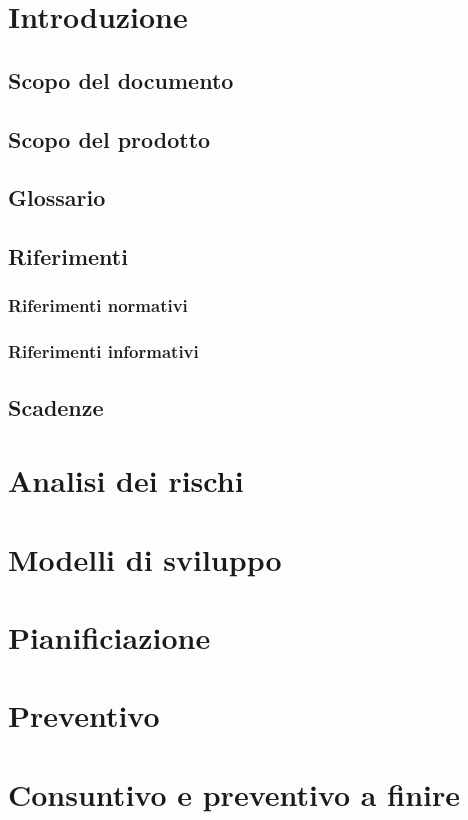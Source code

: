 \documentclass[a4paper, oneside, openany, dvipsnames, table]{article}
\begin{document}
\copertina{}


\newpage
\tableofcontents
\newpage

\section{Introduzione}
	\subsection{Scopo del documento}
		
	\subsection{Scopo del prodotto}
		
	\subsection{Glossario}
		
	\subsection{Riferimenti}
		\subsubsection{Riferimenti normativi}
			
		\subsubsection{Riferimenti informativi}
			
	\subsection{Scadenze}
		
\section{Analisi dei rischi}
	
	
\section{Modelli di sviluppo}
\section{Pianificiazione}
\section{Preventivo}
\section{Consuntivo e preventivo a finire}
\end{document}
